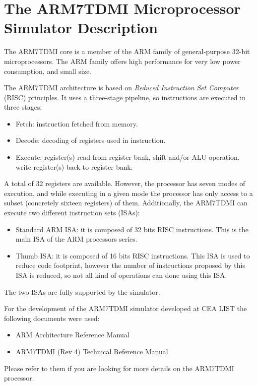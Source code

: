 \section{The ARM7TDMI Microprocessor Simulator Description}

The ARM7TDMI core is a member of the ARM family of general-purpose 32-bit microprocessors.
The ARM family offers high performance for very low power consumption, and small size.

The ARM7TDMI architecture is based on \textit{Reduced Instruction Set Computer} (RISC) principles.
It uses a three-stage pipeline, so instructions are executed in three stages:
\begin{itemize}
	\item Fetch: instruction fetched from memory.
	\item Decode: decoding of registers used in instruction.
	\item Execute: register(s) read from register bank, shift and/or ALU operation, write register(s) back to register bank.
\end{itemize}
A total of 32 registers are available.
However, the processor has seven modes of execution, and while executing in a given mode the processor has only access to a subset (concretely sixteen registers) of them.
Additionally, the ARM7TDMI can execute two different instruction sets (ISAs):
\begin{itemize}
	\item Standard ARM ISA: it is composed of 32 bits RISC instructions. This is the main ISA of the ARM processors series.
	\item Thumb ISA: it is composed of 16 bits RISC instructions. This ISA is used to reduce code footprint, however the number of instructions proposed by this ISA is reduced, so not all kind of operations can done using this ISA.
\end{itemize}
The two ISAs are fully supported by the simulator.

For the development of the ARM7TDMI simulator developed at CEA LIST the following documents were used:
\begin{itemize}
	\item ARM Architecture Reference Manual
	\item ARM7TDMI (Rev 4) Technical Reference Manual
\end{itemize}
Please refer to them if you are looking for more details on the ARM7TDMI processor.

